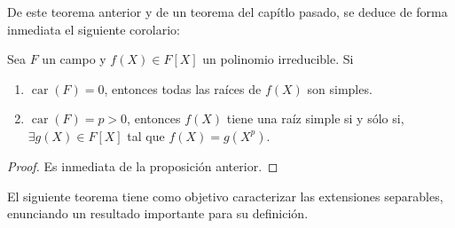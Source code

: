 \documentclass[12pt]{report}
\theoremstyle{largebreak}
\DeclareMathOperator{\car}{car}
\begin{document}
    De este teorema anterior y de un teorema del capítlo pasado, se deduce de forma inmediata el siguiente corolario:

    \begin{cor}
        Sea $F$ un campo y $f(X)\in F[X]$ un polinomio irreducible. Si
        \begin{enumerate}
            \item $\car(F)=0$, entonces todas las raíces de $f(X)$ son simples.
            \item $\car(F)=p>0$, entonces $f(X)$ tiene una raíz simple si y sólo si, $\exists g(X)\in F[X]$ tal que $f(X)=g(X^{p})$.
        \end{enumerate}
    \end{cor}

    

    \begin{proof}
        Es inmediata de la proposición anterior.
    \end{proof}

    El siguiente teorema tiene como objetivo caracterizar las extensiones separables, enunciando un resultado importante para su definición.
    
\end{document}
